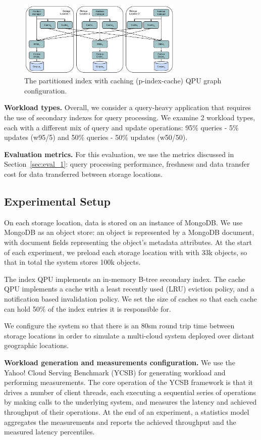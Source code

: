 \begin{figure}[H]
\centering
  \includegraphics[width=0.7\textwidth]{./figures/evaluation/p_index_cache.pdf}
  \caption{The partitioned index with caching (p-index-cache) QPU graph configuration.}
  \label{fig:p_index_cache}
\end{figure}

\bigskip
\noindent
\textbf{Workload types.}
Overall, we consider a query-heavy application that requires the use of secondary indexes for query processing.
We examine 2 workload types, each with a different mix of query and update operations:
95\% queries - 5\% updates (w95/5) and 50\% queries - 50\% updates (w50/50).

\bigskip
\noindent
\textbf{Evaluation metrics.}
For this evaluation, we use the metrics discussed in Section~\ref{sec:eval_1}:
query processing performance, freshness and data transfer cost for data transferred between storage locations.

\subsection{Experimental Setup}
On each storage location, data is stored on an instance of MongoDB.
We use MongoDB as an object store:
an object is represented by a MongoDB document, with document fields representing the object's metadata attributes.
At the start of each experiment, we preload each storage location with with 33k objects,
so that in total the system stores 100k objects.

The index QPU implements an in-memory B-tree secondary index.
The cache QPU implements a cache with a least recently used (LRU) eviction policy,
and a notification based invalidation policy.
We set the size of caches so that each cache can hold 50\% of the index entries it is responsible for.

We configure the system so that there is an 80sm round trip time between storage locations in order to
simulate a multi-cloud system deployed over distant geographic locations.

\bigskip
\noindent
\textbf{Workload generation and measurements configuration.}
We use the Yahoo! Cloud Serving Benchmark (YCSB) \cite{ycsb} for generating workload and performing measurements.
The core operation of the YCSB framework is that it drives a number of client threads,
each executing a sequential series of operations by making calls to the underlying system,
and measures the latency and achieved throughput of their operations.
At the end of an experiment, a statistics model aggregates the measurements and reports the achieved throughput and
the measured latency percentiles.

